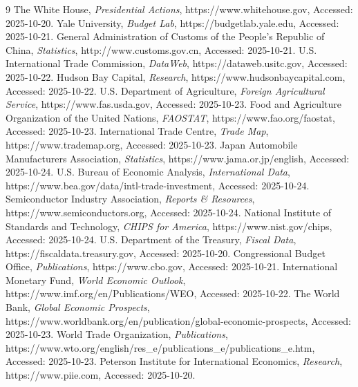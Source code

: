 \documentclass{apmcmthesis}
\begin{document}
\begin{thebibliography}{9}%
 The White House, \textit{Presidential Actions}, https://www.whitehouse.gov, Accessed: 2025-10-20.
 Yale University, \textit{Budget Lab}, https://budgetlab.yale.edu, Accessed: 2025-10-21.
 General Administration of Customs of the People's Republic of China, \textit{Statistics}, http://www.customs.gov.cn, Accessed: 2025-10-21.
 U.S. International Trade Commission, \textit{DataWeb}, https://dataweb.usitc.gov, Accessed: 2025-10-22.
 Hudson Bay Capital, \textit{Research}, https://www.hudsonbaycapital.com, Accessed: 2025-10-22.
 U.S. Department of Agriculture, \textit{Foreign Agricultural Service}, https://www.fas.usda.gov, Accessed: 2025-10-23.
 Food and Agriculture Organization of the United Nations, \textit{FAOSTAT}, https://www.fao.org/faostat, Accessed: 2025-10-23.
 International Trade Centre, \textit{Trade Map}, https://www.trademap.org, Accessed: 2025-10-23.
 Japan Automobile Manufacturers Association, \textit{Statistics}, https://www.jama.or.jp/english, Accessed: 2025-10-24.
 U.S. Bureau of Economic Analysis, \textit{International Data}, https://www.bea.gov/data/intl-trade-investment, Accessed: 2025-10-24.
 Semiconductor Industry Association, \textit{Reports \& Resources}, https://www.semiconductors.org, Accessed: 2025-10-24.
 National Institute of Standards and Technology, \textit{CHIPS for America}, https://www.nist.gov/chips, Accessed: 2025-10-24.
 U.S. Department of the Treasury, \textit{Fiscal Data}, https://fiscaldata.treasury.gov, Accessed: 2025-10-20.
 Congressional Budget Office, \textit{Publications}, https://www.cbo.gov, Accessed: 2025-10-21.
 International Monetary Fund, \textit{World Economic Outlook}, https://www.imf.org/en/Publications/WEO, Accessed: 2025-10-22.
 The World Bank, \textit{Global Economic Prospects}, https://www.worldbank.org/en/publication/global-economic-prospects, Accessed: 2025-10-23.
 World Trade Organization, \textit{Publications}, https://www.wto.org/english/res\_e/publications\_e/publications\_e.htm, Accessed: 2025-10-23.
 Peterson Institute for International Economics, \textit{Research}, https://www.piie.com, Accessed: 2025-10-20.
\end{thebibliography}
\end{document}
